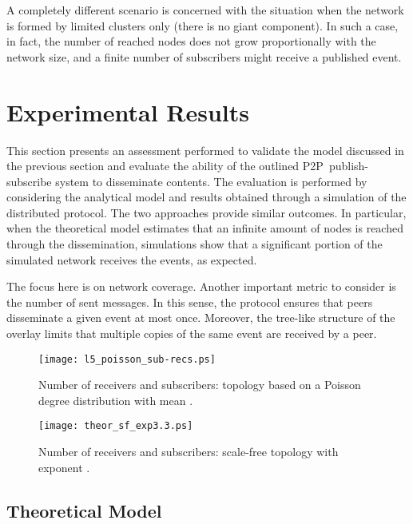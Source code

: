 \documentclass[10pt, conference, compsocconf]{IEEEtran}
\begin{document}
A completely different scenario is concerned with the situation when the network is formed by limited clusters only (there is no giant component). In such a case, in fact, the number of reached nodes does not grow proportionally with the network size, and a finite number of subscribers might receive a published event.

\section{Experimental Results}\label{sec:exp}

This section presents an assessment performed to validate the model discussed in the previous section and evaluate the ability of the outlined \ac{P2P}~publish-subscribe system to disseminate contents. The evaluation is performed by considering the analytical model and results obtained through a simulation of the distributed protocol. The two approaches provide similar outcomes. In particular, when the theoretical model estimates that an infinite amount of nodes is reached through the dissemination, simulations show that a significant portion of the simulated network receives the events, as expected.

The focus here is on network coverage. Another important metric to consider is the number of sent messages. In this sense, the protocol ensures that peers disseminate a given event at most once.
Moreover, the tree-like structure of the overlay limits that multiple copies of the same event are received by a peer.


\begin{figure}[t]
   \centering
   \texttt{[image: l5\_poisson\_sub-recs.ps]}
   \caption{Number of receivers and subscribers: topology based on a Poisson degree distribution with mean .}
   \label{fig:poisson_l5_sub}
\end{figure}

\begin{figure}[t]
   \centering
   \texttt{[image: theor\_sf\_exp3.3.ps]}
   \caption{Number of receivers and subscribers: scale-free topology with exponent .}
   \label{fig:sf_sub}
\end{figure}


\subsection{Theoretical Model}
\end{document}
